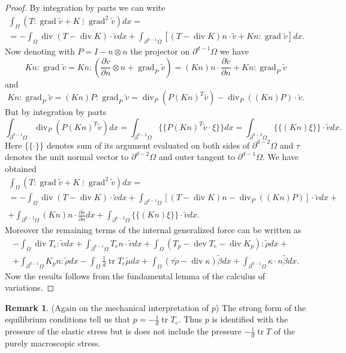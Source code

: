 \documentclass[a4paper,10pt,twoside]{amsbook}
\numberwithin{section}{chapter}
\numberwithin{equation}{chapter}
\theoremstyle{definition}
\newtheorem{rmk}[prop]{Remark}
\DeclareMathOperator{\dev}{dev}
\DeclareMathOperator{\diver}{div}
\DeclareMathOperator{\tr}{tr}
\DeclareMathOperator{\grad}{grad}
\newcommand{\dind}[2]{\frac{\partial #1}{\partial #2}}
\newcommand{\threedots}{\mathbin{\vdots}}
\begin{document}
\begin{proof}
By integration by parts we can write
\begin{multline*}
\int_\Omega\left(T:\grad\tilde v+K\threedots\grad^2\tilde v\right)dx=\\
=-\int_\Omega\diver(T-\diver K)\cdot\tilde vdx+\int_{\partial^{d-1}\Omega}\left[(T-\diver K)n\cdot\tilde v+Kn:\grad\tilde v\right]dx.
\end{multline*}
Now denoting with $P=I-n\otimes n$ the projector on $\partial^{d-1}\Omega$ we have
\[
Kn:\grad\tilde v=Kn:\left(\dind{\tilde v}{n}\otimes n+\grad_P\tilde v\right)=(Kn)n\cdot\dind{\tilde v}{n}+Kn:\grad_P\tilde v
\]
and
\[
Kn:\grad_P\tilde v=(Kn)P:\grad_P\tilde v=\diver_P(P(Kn)^T\tilde v)-\diver_P((Kn)P)\cdot\tilde v.
\]
But by integration by parts
\[
\int_{\partial^{d-1}\Omega}\diver_P(P(Kn)^T\tilde v)dx=\int_{\partial^{d-2}\Omega}\{\!\!\{P(Kn)^T\tilde v\cdot\xi\}\!\!\}dx=\int_{\partial^{d-2}\Omega}\{\!\!\{(Kn)\xi\}\!\!\}\cdot\tilde vdx.
\]
Here $\{\!\!\{\cdot\}\!\!\}$ denotes sum of its argument evaluated on both sides of $\partial^{d-2}\Omega$ and $\tau$ denotes the unit normal vector to $\partial^{d-2}\Omega$ and outer tangent to $\partial^{d-1}\Omega$. We have obtained
\begin{multline*}
\int_\Omega\left(T:\grad\tilde v+K\threedots\grad^2\tilde v\right)dx=\\
=-\int_\Omega\diver(T-\diver K)\cdot\tilde vdx+\int_{\partial^{d-1}\Omega}\left[(T-\diver K)n-\diver_P((Kn)P)\right]\cdot\tilde vdx+\\
+\int_{\partial^{d-1}\Omega}(Kn)n\cdot\dind{\tilde v}{n}dx+\int_{\partial^{d-2}\Omega}\{\!\!\{(Kn)\xi\}\!\!\}\cdot\tilde vdx.
\end{multline*}
Moreover the remaining terms of the internal generalized force can be written as
\begin{multline*}
-\int_\Omega\diver T_e:\tilde vdx+\int_{\partial^{d-1}\Omega}T_en\cdot\tilde vdx+\int_\Omega(T_p-\dev T_e-\diver K_p):\tilde\rho dx+\\
+\int_{\partial^{d-1}\Omega}K_pn:\tilde\rho dx-\int_\Omega\frac{1}{d}\tr T_e\tilde\mu dx+\int_\Omega(\tau\tilde\rho-\diver\kappa)\tilde\beta dx+\int_{\partial^{d-1}\Omega}\kappa\cdot n\tilde\beta dx.
\end{multline*}
Now the results follows from the fundamental lemma of the calculus of variations.
\end{proof}
\begin{rmk}(Again on the mechanical interpretation of $p$)
The strong form of the equilibrium conditions tell us that $p=-\frac{1}{d}\tr T_e$. Thus $p$ is identified with the pressure of the elastic stress but is does not include the pressure $-\frac{1}{d}\tr T$ of the purely macroscopic stress.
\end{rmk}
\end{document}
